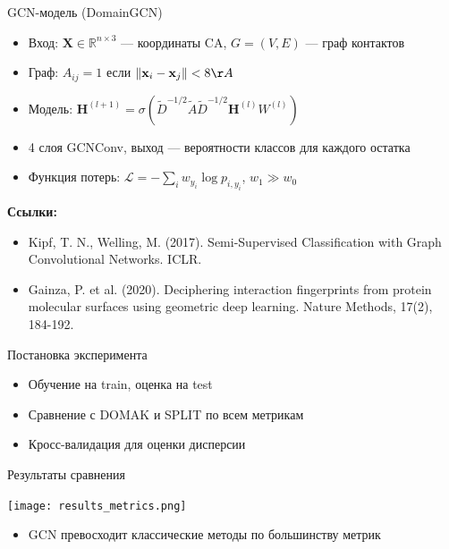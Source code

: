 \documentclass{beamer}
\begin{document}
\begin{frame}{GCN-модель (DomainGCN)}
  \begin{itemize}
    \item Вход: $\mathbf{X} \in \mathbb{R}^{n \times 3}$ — координаты CA, $G=(V,E)$ — граф контактов
    \item Граф: $A_{ij} = 1$ если $\|\mathbf{x}_i - \mathbf{x}_j\| < 8\AA$
    \item Модель: $\mathbf{H}^{(l+1)} = \sigma(\tilde{D}^{-1/2} \tilde{A} \tilde{D}^{-1/2} \mathbf{H}^{(l)} W^{(l)})$
    \item 4 слоя GCNConv, выход — вероятности классов для каждого остатка
    \item Функция потерь: $\mathcal{L} = -\sum_i w_{y_i} \log p_{i, y_i}$, $w_1 \gg w_0$
  \end{itemize}
  \vspace{0.5em}
  \textbf{Ссылки:}
  \begin{itemize}
    \item \footnotesize Kipf, T. N., Welling, M. (2017). Semi-Supervised Classification with Graph Convolutional Networks. ICLR.
    \item \footnotesize Gainza, P. et al. (2020). Deciphering interaction fingerprints from protein molecular surfaces using geometric deep learning. Nature Methods, 17(2), 184-192.
  \end{itemize}
\end{frame}

\begin{frame}{Постановка эксперимента}
  \begin{itemize}
    \item Обучение на train, оценка на test
    \item Сравнение с DOMAK и SPLIT по всем метрикам
    \item Кросс-валидация для оценки дисперсии
  \end{itemize}
\end{frame}

\begin{frame}{Результаты сравнения}
  \begin{center}
    \texttt{[image: results\_metrics.png]} %
  \end{center}
  \begin{itemize}
    \item GCN превосходит классические методы по большинству метрик
  \end{itemize}
\end{frame}
\end{document}
